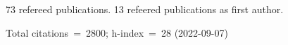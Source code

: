 73 refereed publications. 13 refeered publications as first author.

Total citations~=~2800; h-index~=~28 (2022-09-07)